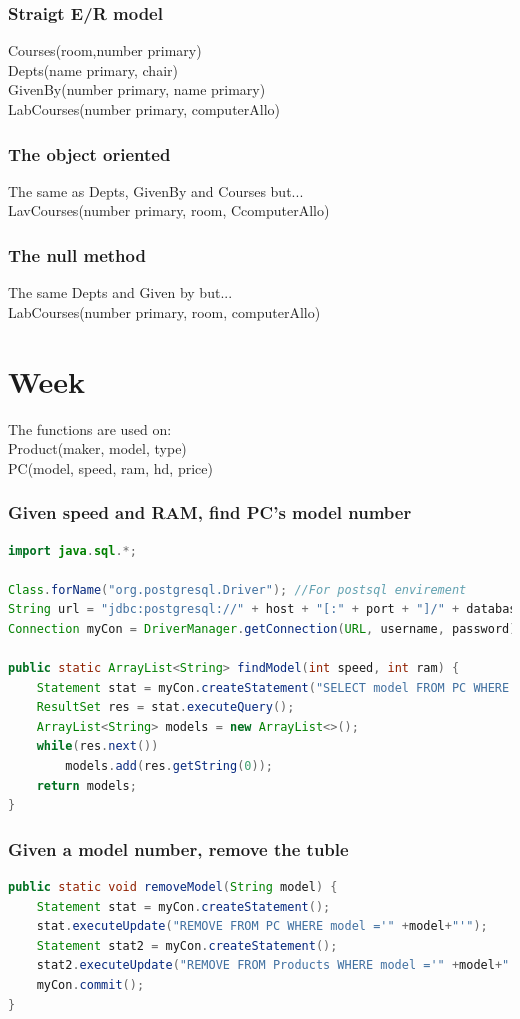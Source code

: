 \documentclass[12pt, a4paper]{article}
\begin{document}
		 		\subsubsection{Straigt E/R model}
					Courses(room,number primary)\\
					Depts(name primary, chair)\\
					GivenBy(number primary, name primary)\\
					LabCourses(number primary, computerAllo)
				\subsubsection{The object oriented}
					The same as Depts, GivenBy and Courses but...\\
					LavCourses(number primary, room, CcomputerAllo)
				\subsubsection{The null method}
					The same Depts and Given by but...\\
					LabCourses(number primary, room, computerAllo)
	\section{Week}
			The functions are used on:\\
			Product(maker, model, type)\\
			PC(model, speed, ram, hd, price)
			\subsubsection{Given speed and RAM, find PC's model number}
				\begin{lstlisting}[language=Java]
import java.sql.*;

Class.forName("org.postgresql.Driver"); //For postsql envirement
String url = "jdbc:postgresql://" + host + "[:" + port + "]/" + database;
Connection myCon = DriverManager.getConnection(URL, username, password);

public static ArrayList<String> findModel(int speed, int ram) {
	Statement stat = myCon.createStatement("SELECT model FROM PC WHERE speed =" + speed + " AND ram =" +ram);
	ResultSet res = stat.executeQuery();
	ArrayList<String> models = new ArrayList<>();
	while(res.next()) 
		models.add(res.getString(0));
	return models;
}	
\end{lstlisting}
			\subsubsection{Given a model number, remove the tuble}
				\begin{lstlisting}[language=Java]
public static void removeModel(String model) {
	Statement stat = myCon.createStatement();
	stat.executeUpdate("REMOVE FROM PC WHERE model ='" +model+"'");
	Statement stat2 = myCon.createStatement();
	stat2.executeUpdate("REMOVE FROM Products WHERE model ='" +model+"'");
	myCon.commit();
}
				\end{lstlisting}
\end{document}
